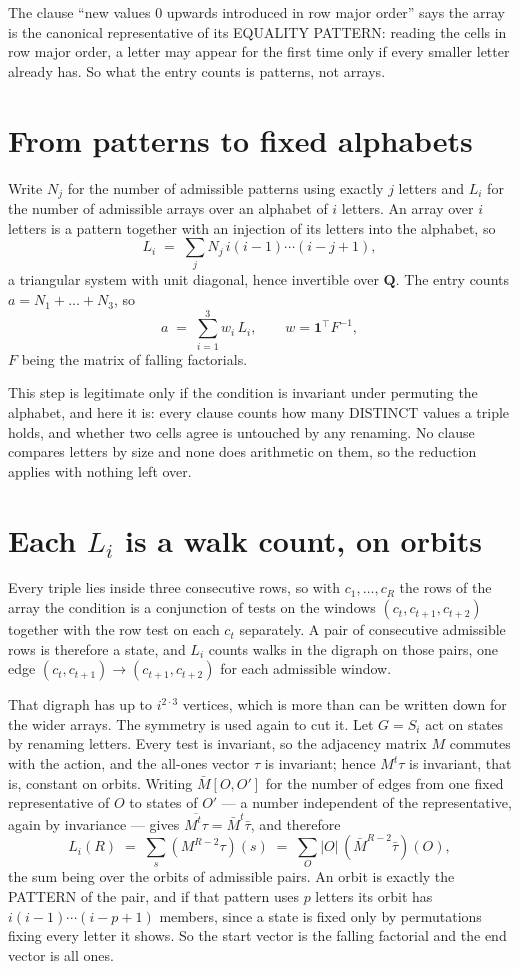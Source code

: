 \documentclass[11pt,a4paper]{article}
\theoremstyle{plain}
\theoremstyle{definition}
\begin{document}
The clause ``new values $0$ upwards introduced in row major order'' says the array is the
canonical representative of its EQUALITY PATTERN: reading the cells in row major order, a
letter may appear for the first time only if every smaller letter already has. So what the
entry counts is patterns, not arrays.

\section{From patterns to fixed alphabets}

Write $N_j$ for the number of admissible patterns using exactly $j$ letters and $L_i$ for the
number of admissible arrays over an alphabet of $i$ letters. An array over $i$ letters is a
pattern together with an injection of its letters into the alphabet, so
\[
L_i\;=\;\sum_j N_j\,i(i-1)\cdots(i-j+1),
\]
a triangular system with unit diagonal, hence invertible over $\mathbf{Q}$. The entry counts
$a=N_1+\dots+N_{3}$, so
\[
a\;=\;\sum_{i=1}^{3}w_i\,L_i ,\qquad w=\mathbf{1}^{\!\top}F^{-1},
\]
$F$ being the matrix of falling factorials.

This step is legitimate only if the condition is invariant under permuting the alphabet, and
here it is: every clause counts how many DISTINCT values a triple holds, and whether two cells
agree is untouched by any renaming. No clause compares letters by size and none does arithmetic
on them, so the reduction applies with nothing left over.

\section{Each $L_i$ is a walk count, on orbits}

Every triple lies inside three consecutive rows, so with $c_1,\dots,c_R$ the rows of the array
the condition is a conjunction of tests on the windows $(c_{t},c_{t+1},c_{t+2})$ together
with the row test on each $c_t$ separately. A pair of consecutive admissible rows is therefore
a state, and $L_i$ counts walks in the digraph on those pairs, one edge $(c_t,c_{t+1})\to
(c_{t+1},c_{t+2})$ for each admissible window.

That digraph has up to $i^{2\cdot3}$ vertices, which is more than can be written down for
the wider arrays. The symmetry is used again to cut it. Let $G=S_i$ act on states by renaming
letters. Every test is invariant, so the adjacency matrix $M$ commutes with the action, and the
all-ones vector $\tau$ is invariant; hence $M^{t}\tau$ is invariant, that is, constant on
orbits. Writing $\bar M[O,O']$ for the number of edges from one fixed representative of $O$ to
states of $O'$ --- a number independent of the representative, again by invariance --- gives
$\overline{M^{t}\tau}=\bar M^{t}\bar\tau$, and therefore
\[
L_i(R)\;=\;\sum_{s}(M^{R-2}\tau)(s)\;=\;\sum_{O}|O|\,(\bar M^{R-2}\bar\tau)(O),
\]
the sum being over the orbits of admissible pairs. An orbit is exactly the PATTERN of the pair,
and if that pattern uses $p$ letters its orbit has $i(i-1)\cdots(i-p+1)$ members, since a state
is fixed only by permutations fixing every letter it shows. So the start vector is the falling
factorial and the end vector is all ones.
\end{document}
